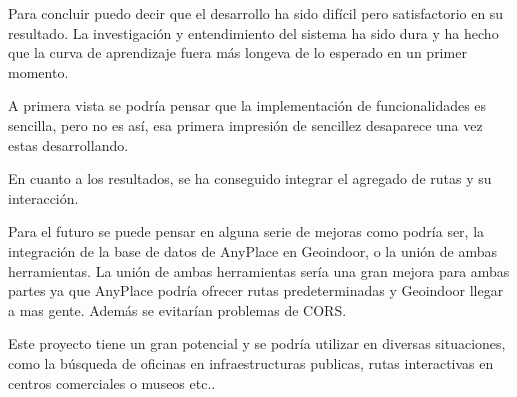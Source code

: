 
Para concluir puedo decir que el desarrollo ha sido difícil pero satisfactorio en su resultado. La investigación y entendimiento del sistema ha sido dura y ha hecho que la curva de aprendizaje fuera más longeva de lo esperado en un primer momento.

A primera vista se podría pensar que la implementación de funcionalidades es sencilla, pero no es así, esa primera impresión de sencillez desaparece una vez estas desarrollando. 

En cuanto a los resultados, se ha conseguido integrar el agregado de rutas y su interacción.

Para el futuro se puede pensar en alguna serie de mejoras como podría ser, la integración de la base de datos de AnyPlace en Geoindoor, o la unión de ambas herramientas. La unión de ambas herramientas sería una gran mejora para ambas partes ya que AnyPlace podría ofrecer rutas predeterminadas y Geoindoor llegar a mas gente. Además se evitarían problemas de CORS.

Este proyecto tiene un gran potencial y se podría utilizar en diversas situaciones, como la búsqueda de oficinas en infraestructuras publicas, rutas interactivas en centros comerciales o museos etc..  

